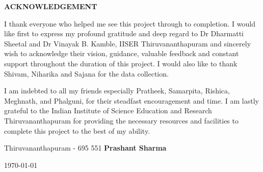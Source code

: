 \begin{center}
{\large{\bf{ACKNOWLEDGEMENT}}}
\end{center}


\noindent
I thank everyone who helped me see this project through to completion. I would like first to express my profound gratitude and deep regard to Dr Dharmatti Sheetal and Dr Vinayak B. Kamble, IISER Thiruvananthapuram and sincerely wish to acknowledge their vision, guidance, valuable feedback and constant support throughout the duration of this project. I would also like to thank Shivam, Niharika and Sajana for the data collection.

I am indebted to all my friends especially Pratheek, Samarpita, Rishica, Meghnath, and Phalguni,  for their steadfast encouragement and time. I am lastly grateful to the Indian Institute of Science Education and Research Thiruvananthapuram for providing the necessary resources and facilities to complete this project to the best of my ability.



\vspace{4cm} %

\noindent Thiruvananthapuram - 695 551 \hfill \textbf{Prashant Sharma}

\noindent \today \hfill

\clearpage